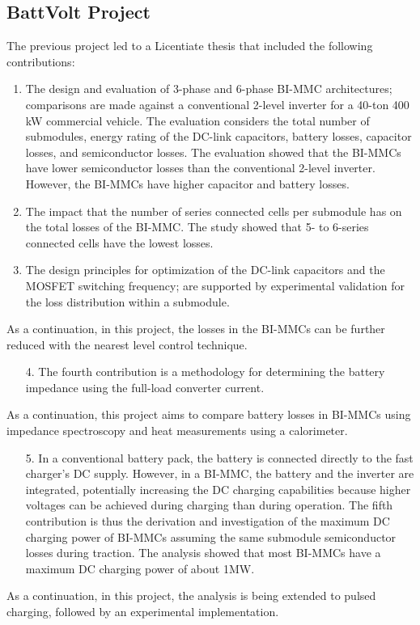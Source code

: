 \documentclass{article}
\begin{document}
\subsection{BattVolt Project}
The previous project led to a Licentiate thesis \cite{balachandran2023battery} that included the following contributions:
\begin{enumerate}
    \item The design and evaluation of 3-phase and 6-phase BI-MMC architectures; comparisons are made against a conventional 2-level inverter for a 40-ton 400 kW commercial vehicle. The evaluation considers the total number of submodules, energy rating of the DC-link capacitors, battery losses, capacitor losses, and semiconductor losses. The evaluation showed that the BI-MMCs have lower semiconductor losses than the conventional 2-level inverter. However, the BI-MMCs have higher capacitor and battery losses. 
    \item The impact that the number of series connected cells per submodule has on the total losses of the BI-MMC. The study showed that 5- to 6-series connected cells have the lowest losses. 
    \item The design principles for optimization of the DC-link capacitors and the MOSFET switching frequency; are supported by experimental validation for the loss distribution within a submodule. 
\end{enumerate}
As a continuation, in this project, the losses in the BI-MMCs can be further reduced with the nearest level control technique. 
\begin{enumerate}
    \item[4.] The fourth contribution is a methodology for determining the battery impedance using the full-load converter current. 
\end{enumerate}
As a continuation, this project aims to compare battery losses in BI-MMCs using impedance spectroscopy and heat measurements using a calorimeter. 
\begin{enumerate}
    \item[5.] In a conventional battery pack, the battery is connected directly to the fast charger's DC supply. However, in a BI-MMC, the battery and the inverter are integrated, potentially increasing the DC charging capabilities because higher voltages can be achieved during charging than during operation. The fifth contribution is thus the derivation and investigation of the maximum DC charging power of BI-MMCs assuming the same submodule semiconductor losses during traction. The analysis showed that most BI-MMCs have a maximum DC charging power of about 1MW.
\end{enumerate}
As a continuation, in this project, the analysis is being extended to pulsed charging, followed by an experimental implementation. 
\end{document}
